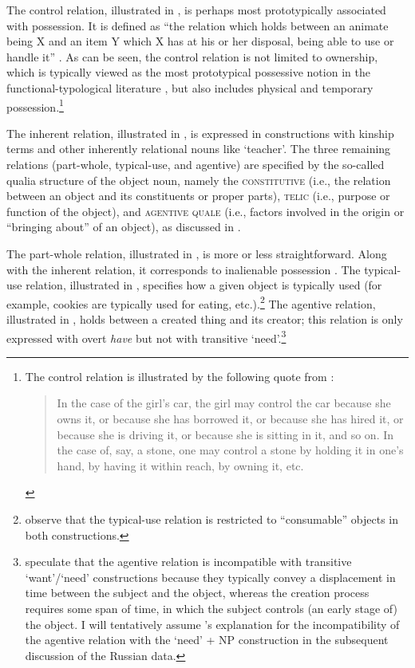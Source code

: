 \documentclass[output=paper,colorlinks,citecolor=brown]{langscibook}
\begin{document}
The control relation, illustrated in , is perhaps most prototypically associated with possession. It is defined as ``\label{ViknerJensen-control}the relation which holds between an animate being X and an item Y which X has at his or her disposal, being able to use or handle it'' \citep[196--197]{Vikner.Jensen2002}. As can be seen, the control relation is not limited to ownership, which is typically viewed as the most prototypical possessive notion in the functional-typological literature \citep[see, e.g.,][]{Heine1997}, but also includes physical and temporary possession.\footnote{The control relation is illustrated by the following quote from \citeauthor{Vikner.Jensen2002}:
\begin{quote}In the case of the girl's car, the girl may control the car because she owns it, or because she has borrowed it, or because she has hired it, or because she is driving it, or because she is sitting in it, and so on. In the case of, say, a stone, one may control a stone by holding it in one's hand, by having it within reach, by owning it, etc. \hfill  \citep[196--197]{Vikner.Jensen2002}
\end{quote}}

The inherent relation, illustrated in , is expressed in constructions with kinship terms and other inherently relational nouns like `teacher'. The three remaining relations (part-whole, typical-use, and agentive) are specified by the so-called qualia structure of the object noun, namely the \textsc{constitutive} (i.e., the relation between an object and its constituents or proper parts), \textsc{telic} (i.e., purpose or function of the object), and \textsc{agentive quale} (i.e., factors involved in the origin or ``bringing about'' of an object), as discussed in \citet{Pustejovsky1995}.

The part-whole relation, illustrated in , is more or less straightforward. Along with the inherent relation, it corresponds to inalienable possession \citep[see][]{Heine1997}. The typical-use relation, illustrated in , specifies how a given object is typically used (for example, cookies are typically used for eating, etc.).\footnote{\citet{Zaroukian.Beller2013} observe that the typical-use relation is restricted to ``consumable'' objects in both constructions.\label{footnote-cosummable}} The agentive relation, illustrated in , holds between a created thing and its creator; this relation is only expressed with overt \textit{have} but not with transitive `need'.\footnote{\citet{Zaroukian.Beller2013} speculate that the agentive relation is incompatible with transitive `want'/`need' constructions because they typically convey a displacement in time between the subject and the object, whereas the creation process requires some span of time, in which the subject controls (an early stage of) the object. I will tentatively assume \citeauthor{Zaroukian.Beller2013}'s explanation for the incompatibility of the agentive relation with the `need' + NP construction in the subsequent discussion of the Russian data.\label{footnote-agentive}}
\end{document}
